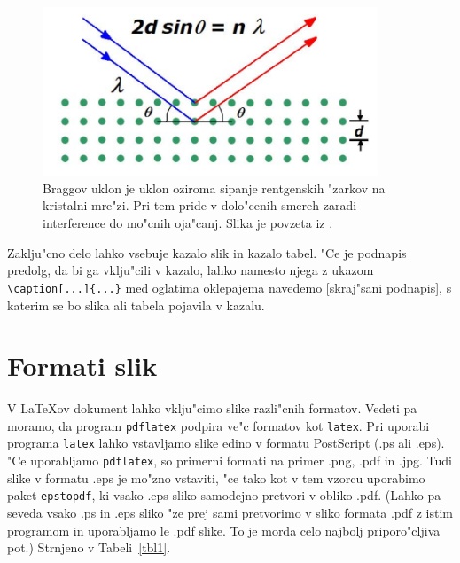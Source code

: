 \begin{figure}[h]
\begin{center}
\includegraphics[width=10cm]{Bragglaw}
\end{center}
\caption[Braggov uklon.]{Braggov uklon je uklon oziroma sipanje 
rentgenskih "zarkov na kristalni mre"zi. Pri tem pride v dolo"cenih 
smereh zaradi interference do mo"cnih oja"canj. 
Slika je povzeta iz \cite{Bragg}.}
\label{pic1}
\end{figure}



Zaklju"cno delo lahko vsebuje kazalo slik in kazalo tabel. 
"Ce je podnapis predolg, da bi ga vklju"cili v kazalo, lahko namesto njega z ukazom \verb|\caption[...]{...}| med oglatima
oklepajema navedemo [skraj"sani podnapis], s katerim se bo slika ali tabela pojavila v kazalu.

\newpage
\section{Formati slik}

V \LaTeX{}ov dokument lahko vklju"cimo slike razli"cnih formatov. 
Vedeti pa moramo, da program {\tt pdflatex} podpira ve"c formatov kot {\tt latex}. 
Pri uporabi programa {\tt latex} lahko vstavljamo slike edino v formatu PostScript (.ps ali .eps). 
"Ce uporabljamo {\tt pdflatex}, so primerni formati na primer .png, .pdf in .jpg.  
Tudi slike v formatu .eps je mo"zno vstaviti, "ce tako kot v tem vzorcu uporabimo paket {\tt epstopdf}, ki vsako .eps sliko samodejno pretvori v obliko .pdf.  
(Lahko pa seveda vsako .ps in .eps sliko "ze prej sami pretvorimo v sliko formata .pdf z istim programom in uporabljamo le .pdf slike.  
To je morda celo najbolj priporo"cljiva pot.)  Strnjeno v Tabeli~\ref{tbl1}.

